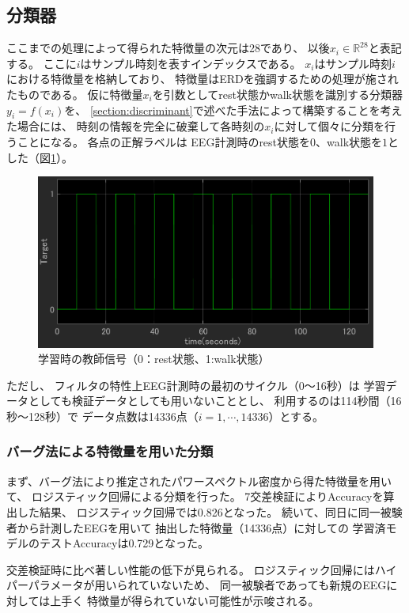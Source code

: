 \subsection{\mc 分類器}
ここまでの処理によって得られた特徴量の次元は28であり、
以後\(x_i \in \mathbb R^{28}\)と表記する。
ここに\(i\)はサンプル時刻を表すインデックスである。
\(x_i\)はサンプル時刻\(i\)における特徴量を格納しており、
特徴量はERDを強調するための処理が施されたものである。
仮に特徴量\(x_i\)を引数としてrest状態かwalk状態を識別する分類器\(y_i=f(x_i)\)を、
\ref{section:discriminant}で述べた手法によって構築することを考えた場合には、
時刻の情報を完全に破棄して各時刻の\(x_i\)に対して個々に分類を行うことになる。
各点の正解ラベルは
EEG計測時のrest状態を\(0\)、walk状態を\(1\)とした（図\ref{fig:targetsignal}）。
\begin{figure}[tp]
    \centering
    \includegraphics[width=13cm]{images/targetsignal.png}
    \caption{学習時の教師信号（0：rest状態、1:walk状態）}
    \label{fig:targetsignal}
\end{figure}

ただし、
フィルタの特性上EEG計測時の最初のサイクル（0〜16秒）は
学習データとしても検証データとしても用いないこととし、
利用するのは114秒間（16秒〜128秒）で
データ点数は14336点（\(i=1,\cdots,14336\)）とする。

\subsubsection{\mc バーグ法による特徴量を用いた分類}
まず、バーグ法により推定されたパワースペクトル密度から得た特徴量を用いて、
ロジスティック回帰による分類を行った。
7交差検証によりAccuracyを算出した結果、
ロジスティック回帰では0.826となった。
続いて、同日に同一被験者から計測したEEGを用いて
抽出した特徴量（14336点）に対しての
学習済モデルのテストAccuracyは0.729となった。

交差検証時に比べ著しい性能の低下が見られる。
ロジスティック回帰にはハイパーパラメータが用いられていないため、
同一被験者であっても新規のEEGに対しては上手く
特徴量が得られていない可能性が示唆される。

